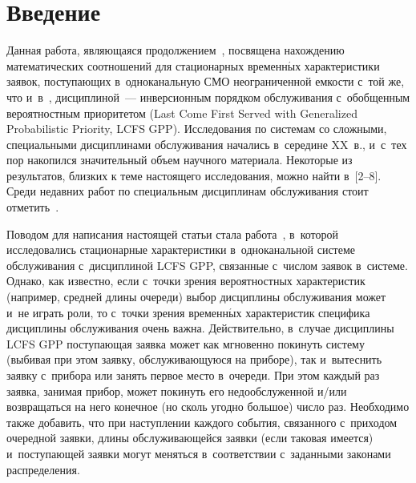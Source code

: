 

\vspace*{-6pt}



\thispagestyle{headings}

\begin{multicols}{2}

\label{st\stat}

\section{Введение}

Данная работа, являющаяся продолжением~\cite{lataavrv}, посвящена нахождению математических соотношений для стационарных временн$\acute{\mbox{ы}}$х характеристики заявок, поступающих в~одноканальную
СМО неограниченной емкости
с~той же, что и~в~\cite{lataavrv}, дисциплиной~---
инверсионным порядком обслуживания с~обобщенным
вероятностным приоритетом (Last Come First Served with Generalized Probabilistic
Priority, {LCFS GPP}).
Исследования по системам со сложными, специальными дисциплинами обслуживания
начались в~середине XX~в., и~с~тех пор накопился значительный
объем научного материала. Некоторые из результатов, близких к теме
настоящего исследования, можно найти
в~[2--8].
Среди недавних работ по специальным дисциплинам обслуживания
стоит отметить~\cite{jawbz, jawbz1}.

Поводом для написания настоящей статьи стала работа~\cite{lataavrv},
в~которой исследовались стационарные характеристики
в~одноканальной системе обслуживания с~дисциплиной {LCFS GPP},
связанные с~чис\-лом заявок в~системе. Однако,
как известно, если с~точки зрения вероятностных характеристик (например,
средней длины очереди)
выбор дисциплины обслуживания может и~не играть роли, то
с~точки зрения временн$\acute{\mbox{ы}}$х характеристик специфика дисциплины обслуживания
очень важна. Действительно, в~случае дисциплины {LCFS GPP}
поступающая заявка может как мгновенно покинуть систему (выбивая
при этом заявку, обслуживающуюся на приборе), так и~вытеснить заявку с~прибора
или занять первое место в~очереди. При этом каждый раз
заявка, занимая прибор, может покинуть его недообслуженной и/или возвращаться на
него конечное (но сколь угодно большое) число раз. Необходимо
также добавить, что при наступлении каждого события, связанного
с~приходом очередной заявки, длины обслуживающейся заявки (если таковая
имеется) и~поступающей заявки могут меняться в~соответствии
с~заданными законами распределения.


\end{multicols}
